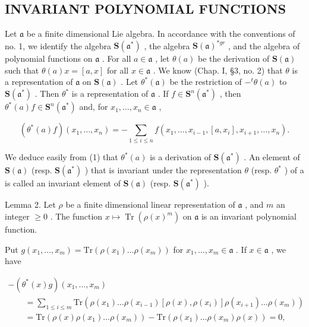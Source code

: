 \subsection{INVARIANT POLYNOMIAL FUNCTIONS}

Let \(\mathfrak{a}\) be a finite dimensional Lie algebra. In accordance with the conventions of no. 1, we identify the algebra \(\mathbf{S}(\mathfrak{a}^{*})\) , the algebra \(\mathbf{S}(\mathfrak{a})^{*gr}\) , and the algebra of polynomial functions on \(\mathfrak{a}\) . For all \(a \in \mathfrak{a}\) , let \(\theta(a)\) be the derivation of \(\mathbf{S}(\mathfrak{a})\) such that \(\theta(a)x = [a, x]\) for all \(x \in \mathfrak{a}\) . We know (Chap. I, §3, no. 2) that \(\theta\) is a representation of \(\mathfrak{a}\) on \(\mathbf{S}(\mathfrak{a})\) . Let \(\theta^{*}(\mathfrak{a})\) be the restriction of \(-^{t}\theta(a)\) to \(\mathbf{S}(\mathfrak{a}^{*})\) . Then \(\theta^{*}\) is a representation of \(\mathfrak{a}\) . If \(f \in \mathbf{S}^{n}(\mathfrak{a}^{*})\) , then \(\theta^{*}(a)f \in \mathbf{S}^{n}(\mathfrak{a}^{*})\) and, for \(x_{1}, \ldots, x_{n} \in \mathfrak{a}\) ,

\[
(\theta^ {*} (a) f) (x _ {1}, \dots , x _ {n}) = - \sum_ {1 \leq i \leq n} f (x _ {1}, \dots , x _ {i - 1}, [ a, x _ {i} ], x _ {i + 1}, \dots , x _ {n}).\tag{1}
\]

We deduce easily from (1) that \(\theta^{*}(a)\) is a derivation of \(\mathbf{S}(\mathfrak{a}^{*})\) . An element of \(\mathbf{S}(\mathfrak{a})\) (resp. \(\mathbf{S}(\mathfrak{a}^{*})\) ) that is invariant under the representation \(\theta\) (resp. \(\theta^{*}\) ) of a is called an invariant element of \(\mathbf{S}(\mathfrak{a})\) (resp. \(\mathbf{S}(\mathfrak{a}^{*})\) ).

Lemma 2. Let \(\rho\) be a finite dimensional linear representation of \(\mathfrak{a}\) , and \(m\) an integer \(\geq 0\) . The function \(x \mapsto \operatorname{Tr}(\rho(x)^m)\) on \(\mathfrak{a}\) is an invariant polynomial function.

Put \(g(x_{1},\ldots ,x_{m}) = \mathrm{Tr}(\rho (x_{1})\ldots \rho (x_{m}))\) for \(x_{1},\ldots ,x_{m}\in \mathfrak{a}\) . If \(x\in \mathfrak{a}\) , we have

\[
\begin{array}{l} - (\theta^ {*} (x) g) (x _ {1}, \ldots , x _ {m}) \\ \qquad = \sum_ {1 \leq i \leq m} \mathrm{Tr} (\rho (x _ {1}) \ldots \rho (x _ {i - 1}) [ \rho (x), \rho (x _ {i}) ] \rho (x _ {i + 1}) \ldots \rho (x _ {m})) \\ \qquad = \mathrm{Tr} (\rho (x) \rho (x _ {1}) \ldots \rho (x _ {m})) - \mathrm{Tr} (\rho (x _ {1}) \ldots \rho (x _ {m}) \rho (x)) = 0, \end{array}
\]

